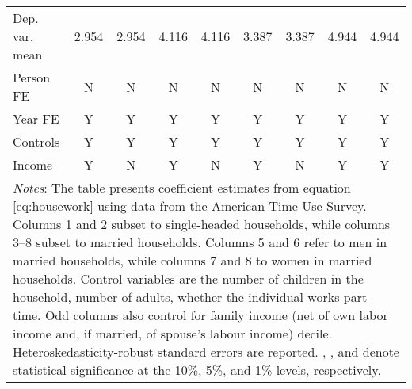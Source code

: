 {\begin{tabular}{l*{8}{c}}
Dep. var. mean      &       2.954         &       2.954         &       4.116         &       4.116         &       3.387         &       3.387         &       4.944         &       4.944         \\
Person FE           &           N         &           N         &           N         &           N         &           N         &           N         &           N         &           N         \\
Year FE             &           Y         &           Y         &           Y         &           Y         &           Y         &           Y         &           Y         &           Y         \\
Controls            &           Y         &           Y         &           Y         &           Y         &           Y         &           Y         &           Y         &           Y         \\
Income              &           Y         &           N         &           Y         &           N         &           Y         &           N         &           Y         &           Y         \\
\bottomrule
\multicolumn{9}{p{17cm}}{\footnotesize \textit{Notes}: The table presents coefficient estimates from equation \ref{eq:housework} using data from the American Time Use Survey. Columns 1 and 2 subset to single-headed households, while columns 3--8 subset to married households. Columns 5 and 6 refer to men in married households, while columns 7 and 8 to women in married households. Control variables are the number of children in the household, number of adults, whether the individual works part-time. Odd columns also control for family income (net of own labor income and, if married, of spouse's labour income) decile. Heteroskedasticity-robust standard errors are reported. \sym{*}, \sym{**}, and \sym{***} denote statistical significance at the 10\%, 5\%, and 1\% levels, respectively.}\\
\end{tabular}
}

